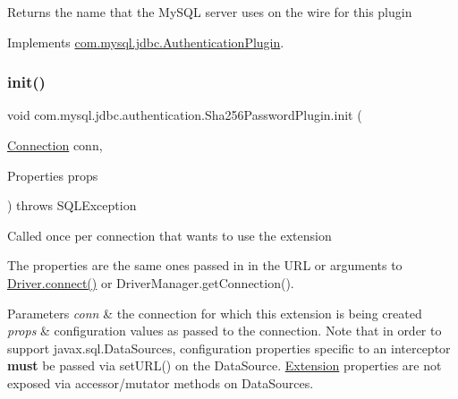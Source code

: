 Returns the name that the My\+S\+QL server uses on the wire for this plugin 

Implements \mbox{\hyperlink{interfacecom_1_1mysql_1_1jdbc_1_1_authentication_plugin_a90dfb5c717939a248527c5bdf512b510}{com.\+mysql.\+jdbc.\+Authentication\+Plugin}}.

\mbox{\label{classcom_1_1mysql_1_1jdbc_1_1authentication_1_1_sha256_password_plugin_afabf8d68fc723bebb401147b2f1a5421}} 
\subsubsection{\texorpdfstring{init()}{init()}}
{\footnotesize\ttfamily void com.\+mysql.\+jdbc.\+authentication.\+Sha256\+Password\+Plugin.\+init (\begin{DoxyParamCaption}\item[{\mbox{\hyperlink{interfacecom_1_1mysql_1_1jdbc_1_1_connection}{Connection}}}]{conn,  }\item[{Properties}]{props }\end{DoxyParamCaption}) throws S\+Q\+L\+Exception}

Called once per connection that wants to use the extension

The properties are the same ones passed in in the U\+RL or arguments to \mbox{\hyperlink{classcom_1_1mysql_1_1jdbc_1_1_non_registering_driver_a834c012e752a01d1ee435b3461bb8218}{Driver.\+connect()}} or Driver\+Manager.\+get\+Connection().


\begin{DoxyParams}{Parameters}
{\em conn} & the connection for which this extension is being created \\
\hline
{\em props} & configuration values as passed to the connection. Note that in order to support javax.\+sql.\+Data\+Sources, configuration properties specific to an interceptor {\bfseries must} be passed via set\+U\+R\+L() on the Data\+Source. \mbox{\hyperlink{interfacecom_1_1mysql_1_1jdbc_1_1_extension}{Extension}} properties are not exposed via accessor/mutator methods on Data\+Sources.\\
\hline
\end{DoxyParams}

